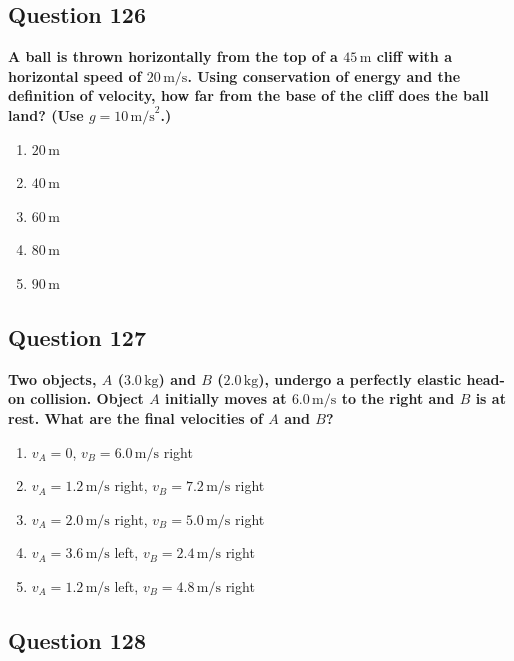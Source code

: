 \documentclass[12pt,letterpaper]{article}
\begin{document}
\subsection{Question 126}

\begin{questionbox}
\textbf{A ball is thrown horizontally from the top of a $45\,\text{m}$ cliff with a horizontal speed of $20\,\text{m/s}$. Using conservation of energy and the definition of velocity, how far from the base of the cliff does the ball land? (Use $g = 10\,\text{m/s}^2$.)}

\begin{enumerate}[label=\alph*)]
    \item $20\,\text{m}$
    \item $40\,\text{m}$
    \item $60\,\text{m}$
    \item $80\,\text{m}$
    \item $90\,\text{m}$
\end{enumerate}
\end{questionbox}

\subsection{Question 127}

\begin{questionbox}
\textbf{Two objects, $A$ ($3.0\,\text{kg}$) and $B$ ($2.0\,\text{kg}$), undergo a perfectly elastic head-on collision. Object $A$ initially moves at $6.0\,\text{m/s}$ to the right and $B$ is at rest. What are the final velocities of $A$ and $B$?}

\begin{enumerate}[label=\alph*)]
    \item $v_A = 0$, $v_B = 6.0\,\text{m/s}$ right
    \item $v_A = 1.2\,\text{m/s}$ right, $v_B = 7.2\,\text{m/s}$ right
    \item $v_A = 2.0\,\text{m/s}$ right, $v_B = 5.0\,\text{m/s}$ right
    \item $v_A = 3.6\,\text{m/s}$ left, $v_B = 2.4\,\text{m/s}$ right
    \item $v_A = 1.2\,\text{m/s}$ left, $v_B = 4.8\,\text{m/s}$ right
\end{enumerate}
\end{questionbox}

\subsection{Question 128}
\end{document}

